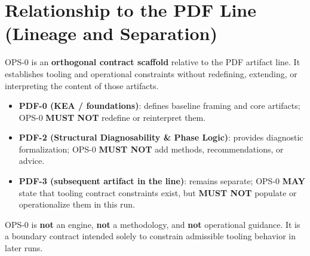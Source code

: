 ﻿\section{Relationship to the PDF Line (Lineage and Separation)}

OPS-0 is an \textbf{orthogonal contract scaffold} relative to the PDF artifact line.
It establishes tooling and operational constraints without redefining, extending,
or interpreting the content of those artifacts.

\begin{itemize}
  \item \textbf{PDF-0 (KEA / foundations)}: defines baseline framing and core artifacts;
        OPS-0 \textbf{MUST NOT} redefine or reinterpret them.
  \item \textbf{PDF-2 (Structural Diagnosability \& Phase Logic)}: provides diagnostic formalization;
        OPS-0 \textbf{MUST NOT} add methods, recommendations, or advice.
  \item \textbf{PDF-3 (subsequent artifact in the line)}: remains separate;
        OPS-0 \textbf{MAY} state that tooling contract constraints exist,
        but \textbf{MUST NOT} populate or operationalize them in this run.
\end{itemize}

OPS-0 is \textbf{not} an engine, \textbf{not} a methodology, and \textbf{not} operational guidance.
It is a boundary contract intended solely to constrain admissible tooling behavior in later runs.
